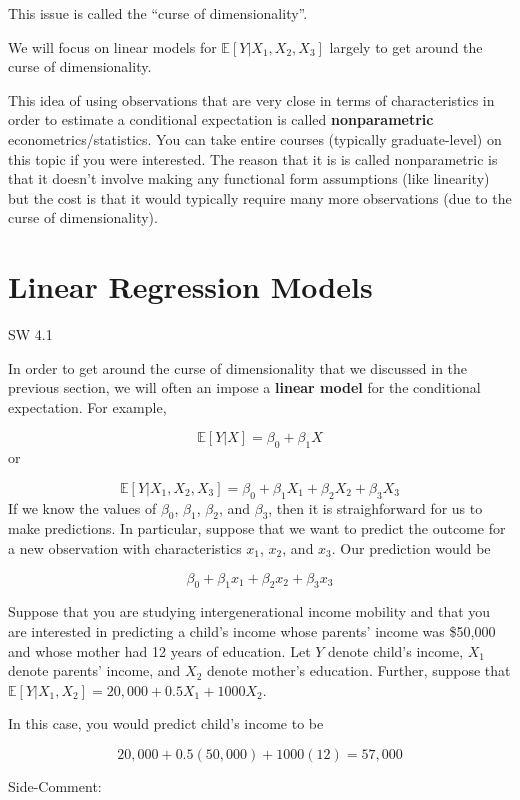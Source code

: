\documentclass[
  letterpaper,
  DIV=11,
  numbers=noendperiod]{scrreprt}
\begin{document}
This issue is called the ``curse of dimensionality''.

We will focus on linear models for \(\mathbb{E}[Y|X_1,X_2,X_3]\) largely
to get around the curse of dimensionality.

This idea of using observations that are very close in terms of
characteristics in order to estimate a conditional expectation is called
\textbf{nonparametric} econometrics/statistics. You can take entire
courses (typically graduate-level) on this topic if you were interested.
The reason that it is is called nonparametric is that it doesn't involve
making any functional form assumptions (like linearity) but the cost is
that it would typically require many more observations (due to the curse
of dimensionality).

\section{Linear Regression Models}\label{linear-regression-models}

SW 4.1

In order to get around the curse of dimensionality that we discussed in
the previous section, we will often an impose a \textbf{linear model}
for the conditional expectation. For example,

\[
  \mathbb{E}[Y|X] = \beta_0 + \beta_1 X
\] or

\[
  \mathbb{E}[Y|X_1,X_2,X_3] = \beta_0 + \beta_1 X_1 + \beta_2 X_2 + \beta_3 X_3
\] If we know the values of \(\beta_0\), \(\beta_1\), \(\beta_2\), and
\(\beta_3\), then it is straighforward for us to make predictions. In
particular, suppose that we want to predict the outcome for a new
observation with characteristics \(x_1\), \(x_2\), and \(x_3\). Our
prediction would be

\[
  \beta_0 + \beta_1 x_1 + \beta_2 x_2 + \beta_3 x_3
\]

Suppose that you are studying intergenerational income mobility and that
you are interested in predicting a child's income whose parents' income
was \$50,000 and whose mother had 12 years of education. Let \(Y\)
denote child's income, \(X_1\) denote parents' income, and \(X_2\)
denote mother's education. Further, suppose that
\(\mathbb{E}[Y|X_1,X_2] = 20,000 + 0.5 X_1 + 1000 X_2\).

In this case, you would predict child's income to be

\[
  20,000 + 0.5 (50,000) + 1000(12) = 57,000
\]

{Side-Comment:}
\end{document}
